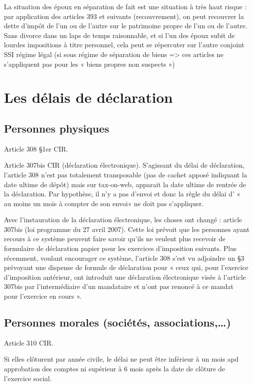 \documentclass{book}
\begin{document}
La situation des époux en séparation de fait est une situation à très haut risque : par application des articles 393 et suivants (recouvrement), on peut recouvrer la dette d’impôt de l’un ou de l’autre sur le patrimoine propre de l’un ou de l’autre. Sans divorce dans un laps de temps raisonnable, et si l’un des époux subit de lourdes impositions à titre personnel, cela peut se répercuter sur l’autre conjoint SSI régime légal (si sous régime de séparation de biens => ces articles ne s’appliquent pas pour les « biens propres non suspects »)

\section{Les délais de déclaration} 

\subsection{Personnes physiques} 

Article 308 §1er CIR. 

Article 307bis CIR (déclaration électronique). S’agissant du délai de déclaration, l’article 308 n’est pas totalement transposable (pas de cachet apposé indiquant la date ultime de dépôt) mais sur tax-on-web, apparait la date ultime de rentrée de la déclaration. Par hypothèse, il n’y a pas d’envoi et donc la règle du délai d’ « au moins un mois à compter de son envoi» ne doit pas s’appliquer. 

Avec l’instauration de la déclaration électronique, les choses ont changé : article 307bis (loi programme du 27 avril 2007). Cette loi prévoit que les personnes ayant recours à ce système peuvent faire savoir qu’ils ne veulent plus recevoir de formulaire de déclaration papier pour les exercices d’imposition suivants. 
Plus récemment, voulant encourager ce système, l’article 308 s’est vu adjoindre un §3 prévoyant une dispense de formule de déclaration pour « ceux qui, pour l'exercice d'imposition antérieur, ont introduit une déclaration électronique visée à l'article 307bis par l'intermédiaire d'un mandataire et n'ont pas renoncé à ce mandat pour l'exercice en cours ».

\subsection{Personnes morales (sociétés, associations,…)}

Article 310 CIR. 

Si elles clôturent par année civile, le délai ne peut être inférieur à un mois apd approbation des comptes ni supérieur à 6 mois après la date de clôture de l’exercice social. 
\end{document}
